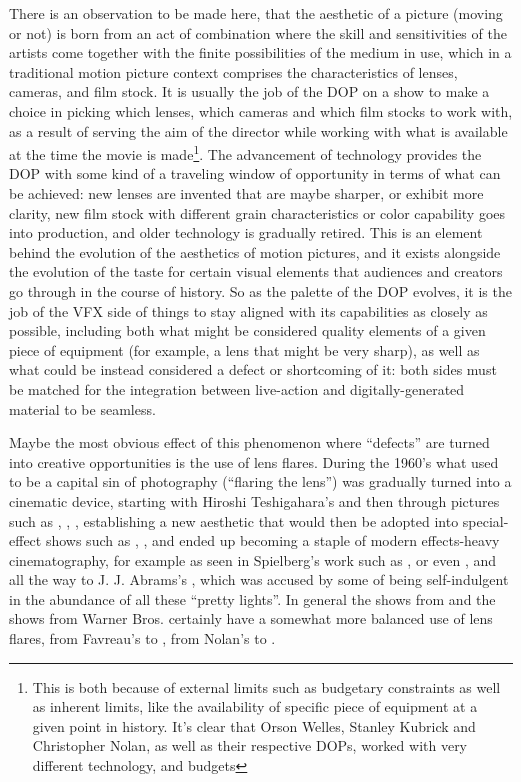 There is an observation to be made here, that the aesthetic of a picture (moving or not) is born from
an act of combination where the skill and sensitivities of the artists come together with the 
finite possibilities of the medium in use, which in a traditional motion picture context comprises 
the characteristics of lenses, cameras, and film stock. 
It is usually the job of the \gls{DOP} on a show to make a choice in picking which lenses, which cameras 
and which film stocks to work with, as a result of serving the aim of the director while working with 
what is available at the time the movie is made\footnote{This is both because of external limits such as 
	budgetary constraints as well as inherent limits, like the availability of specific piece of equipment 
	at a given point in history. It's clear that Orson Welles, Stanley Kubrick and Christopher Nolan, 
	as well as their respective \glspl{DOP}, worked with very different technology, and budgets}. 
The advancement of technology provides the \gls{DOP} with some kind of a traveling 
window of opportunity in terms of what can be achieved: new lenses are invented that are maybe sharper,
or exhibit more clarity, new film stock with different grain characteristics or color capability goes into
production, and older technology is gradually retired.
This is an element behind the evolution of the aesthetics of motion pictures, and it exists alongside the
evolution of the taste for certain visual elements that audiences and creators go through in the course of
history.
So as the palette of the \gls{DOP} evolves, it is the job of the \gls{VFX} side of things to stay
aligned with its capabilities as closely as possible, including both what might be considered
quality elements of a given piece of equipment (for example, a lens that might be very sharp),
as well as what could be instead considered a defect or shortcoming of it: both sides must be
matched for the integration between live-action and digitally-generated material to be seamless. 

Maybe the most obvious effect of this phenomenon where ``defects'' are turned into creative opportunities is
the use of lens flares. 
During the 1960's what used to be a capital sin of photography (``flaring the lens'') was gradually
turned into a cinematic device, starting with Hiroshi Teshigahara's \cite{teshigahara64} and then through pictures 
such as \cite{graduate67}, \cite{easyrider69}, \cite{fiveeasypieces70}, 
establishing a new aesthetic that would then be adopted into special-effect shows such as \cite{spaceodyssey68}, 
\cite{starwars77}, \cite{closeencounters77} and ended up becoming a staple of modern effects-heavy 
cinematography, for example as seen in Spielberg's work such as \cite{raiders81}, \cite{et82} or even
\cite{goonies85}, and all the way to J. J. Abrams's \cite{startrek2013}, which was accused by some
of being self-indulgent in the abundance of all these ``pretty lights''. 
In general the shows from  and the  shows from
Warner Bros. certainly have a somewhat more balanced use of lens flares, from Favreau's 
\cite{ironman08} to \cite{avengers_eg}, from Nolan's \cite{darkknight08} to \cite{blackadam22}.


